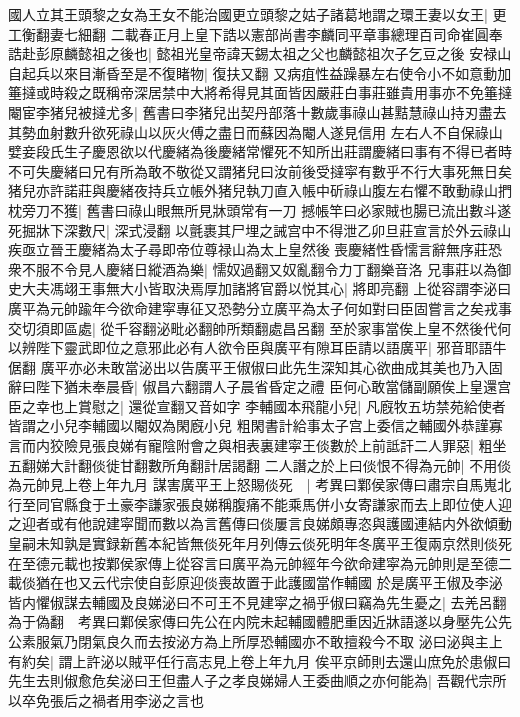 國人立其王頭黎之女為王女不能治國更立頭黎之姑子諸葛地謂之環王妻以女王|{
	更工衡翻妻七細翻}
二載春正月上皇下誥以憲部尚書李麟同平章事總理百司命崔圓奉誥赴彭原麟懿祖之後也|{
	懿祖光皇帝諱天錫太祖之父也麟懿祖次子乞豆之後}
安禄山自起兵以來目漸昏至是不復睹物|{
	復扶又翻}
又病疽性益躁暴左右使令小不如意動加箠撻或時殺之既稱帝深居禁中大將希得見其面皆因嚴莊白事莊雖貴用事亦不免箠撻閹宦李猪兒被撻尤多|{
	舊書曰李猪兒出契丹部落十數歲事祿山甚黠慧祿山持刃盡去其勢血射數升欲死祿山以灰火傅之盡日而蘇因為閹人遂見信用}
左右人不自保祿山嬖妾段氏生子慶恩欲以代慶緒為後慶緒常懼死不知所出莊謂慶緒曰事有不得已者時不可失慶緒曰兄有所為敢不敬從又謂猪兒曰汝前後受撻寜有數乎不行大事死無日矣猪兒亦許諾莊與慶緒夜持兵立帳外猪兒執刀直入帳中斫祿山腹左右懼不敢動祿山捫枕旁刀不獲|{
	舊書曰祿山眼無所見牀頭常有一刀}
撼帳竿曰必家賊也腸已流出數斗遂死掘牀下深數尺|{
	深式浸翻}
以氈裹其尸埋之誡宫中不得泄乙卯旦莊宣言於外云祿山疾亟立晉王慶緒為太子尋即帝位尊禄山為太上皇然後喪慶緒性昏懦言辭無序莊恐衆不服不令見人慶緒日縱酒為樂|{
	懦奴過翻又奴亂翻令力丁翻樂音洛}
兄事莊以為御史大夫馮翊王事無大小皆取決焉厚加諸將官爵以悦其心|{
	將即亮翻}
上從容謂李泌曰廣平為元帥踰年今欲命建寜專征又恐勢分立廣平為太子何如對曰臣固嘗言之矣戎事交切須即區處|{
	從千容翻泌毗必翻帥所類翻處昌呂翻}
至於家事當俟上皇不然後代何以辨陛下靈武即位之意邪此必有人欲令臣與廣平有隙耳臣請以語廣平|{
	邪音耶語牛倨翻}
廣平亦必未敢當泌出以告廣平王俶俶曰此先生深知其心欲曲成其美也乃入固辭曰陛下猶未奉晨昏|{
	俶昌六翻謂人子晨省昏定之禮}
臣何心敢當儲副願俟上皇還宫臣之幸也上賞慰之|{
	還從宣翻又音如字}
李輔國本飛龍小兒|{
	凡廐牧五坊禁苑給使者皆謂之小兒李輔國以閹奴為閑廐小兒}
粗閑書計給事太子宫上委信之輔國外恭謹寡言而内狡險見張良娣有寵陰附會之與相表裏建寜王倓數於上前詆訐二人罪惡|{
	粗坐五翻娣大計翻倓徙甘翻數所角翻計居謁翻}
二人譖之於上曰倓恨不得為元帥|{
	不用倓為元帥見上卷上年九月}
謀害廣平王上怒賜倓死　|{
	考異曰鄴侯家傳曰肅宗自馬嵬北行至同官縣食于土豪李謙家張良娣稱腹痛不能乘馬併小女寄謙家而去上即位使人迎之迎者或有他說建寜聞而數以為言舊傳曰倓屢言良娣頗專恣與護國連結内外欲傾動皇嗣未知孰是實録新舊本紀皆無倓死年月列傳云倓死明年冬廣平王復兩京然則倓死在至德元載也按鄴侯家傳上從容言曰廣平為元帥經年今欲命建寜為元帥則是至德二載倓猶在也又云代宗使自彭原迎倓喪故置于此護國當作輔國}
於是廣平王俶及李泌皆内懼俶謀去輔國及良娣泌曰不可王不見建寜之禍乎俶曰竊為先生憂之|{
	去羌呂翻為于偽翻　考異曰鄴侯家傳曰先公在内院未起輔國體肥重因近牀語遂以身壓先公先公素服氣乃閉氣良久而去按泌方為上所厚恐輔國亦不敢擅殺今不取}
泌曰泌與主上有約矣|{
	謂上許泌以賊平任行高志見上卷上年九月}
俟平京師則去還山庶免於患俶曰先生去則俶愈危矣泌曰王但盡人子之孝良娣婦人王委曲順之亦何能為|{
	吾觀代宗所以卒免張后之禍者用李泌之言也}
